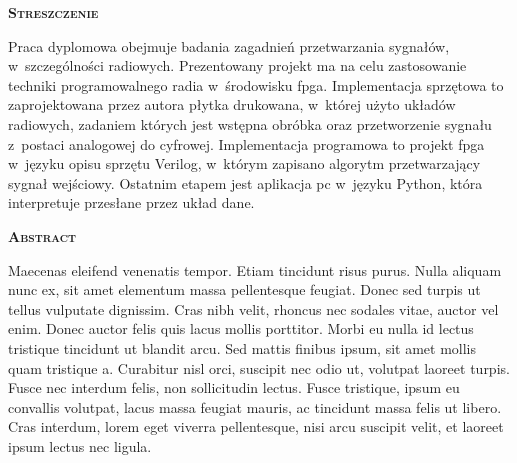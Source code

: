 \newpage
\thispagestyle{empty}

\vspace*{1.5cm}
{	
	\LARGE
	\textsc{\textbf{Streszczenie}}
}
\vspace*{0.5cm}

Praca dyplomowa obejmuje badania zagadnień przetwarzania sygnałów,
w~szczególności radiowych. Prezentowany projekt ma na celu zastosowanie
techniki programowalnego radia w~środowisku \gls{fpga}. Implementacja sprzętowa
to zaprojektowana przez autora płytka drukowana, w~której użyto układów
radiowych, zadaniem których jest wstępna obróbka oraz przetworzenie sygnału
z~postaci analogowej do cyfrowej. Implementacja programowa to projekt \gls{fpga}
w~języku opisu sprzętu Verilog, w~którym zapisano algorytm przetwarzający
sygnał wejściowy. Ostatnim etapem jest aplikacja \gls{pc} w~języku Python, która
interpretuje przesłane przez układ dane.

\vspace*{1.5cm}
{
	\LARGE
	\textsc{\textbf{Abstract}}
}
\vspace*{0.5cm}

Maecenas eleifend venenatis tempor. Etiam tincidunt risus purus. Nulla aliquam nunc ex, sit amet elementum massa pellentesque feugiat. Donec sed turpis ut tellus vulputate dignissim. Cras nibh velit, rhoncus nec sodales vitae, auctor vel enim. Donec auctor felis quis lacus mollis porttitor. Morbi eu nulla id lectus tristique tincidunt ut blandit arcu. Sed mattis finibus ipsum, sit amet mollis quam tristique a. Curabitur nisl orci, suscipit nec odio ut, volutpat laoreet turpis. Fusce nec interdum felis, non sollicitudin lectus. Fusce tristique, ipsum eu convallis volutpat, lacus massa feugiat mauris, ac tincidunt massa felis ut libero. Cras interdum, lorem eget viverra pellentesque, nisi arcu suscipit velit, et laoreet ipsum lectus nec ligula.

